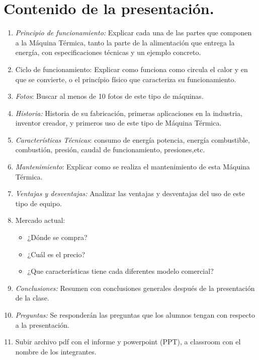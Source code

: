\documentclass[../main]{subfiles}
\begin{document}
\section{Contenido de la presentación.}
\begin{enumerate}
    \item \emph{Principio de funcionamiento:} Explicar cada una de las partes que componen a la Máquina Térmica, tanto la parte de la alimentación que entrega la energía, con especificaciones técnicas y un ejemplo concreto. 
    \item Ciclo de funcionamiento: Explicar como funciona como circula el calor y en que se convierte, o el princípio físico que caracteriza su funcionamiento.
    \item \emph{Fotos}: Buscar al menos de 10 fotos de este tipo de máquinas.
    \item \emph{Historia:} Historia de su fabricación, primeras aplicaciones en la industria, inventor creador, y primeros uso de este tipo de Máquina Térmica.
    \item \emph{Características Técnicas}: consumo de energía potencia, energía combustible, combustión, presión, caudal de funcionamiento, presiones,etc.
    \item \emph{Mantenimiento}: Explicar como se realiza el mantenimiento de esta Máquina Térmica.
    \item \emph{Ventajas y desventajas:} Analizar las ventajas y desventajas del uso de este tipo de equipo. 
    \item Mercado actual:
    \begin{itemize}
        \item ¿Dónde se compra?
        \item ¿Cuál es el precio?
        \item ¿Que características tiene cada diferentes  modelo comercial?
    \end{itemize}
    \item \emph{Conclusiones:} Resumen con conclusiones generales después de la presentación de la clase.
    \item \emph{Preguntas:} Se responderán las preguntas que los alumnos tengan con respecto a la presentación.
    \item Subir archivo pdf con el informe y powerpoint (PPT), a classroom con el nombre de los integrantes.
\end{enumerate}
\end{document}
